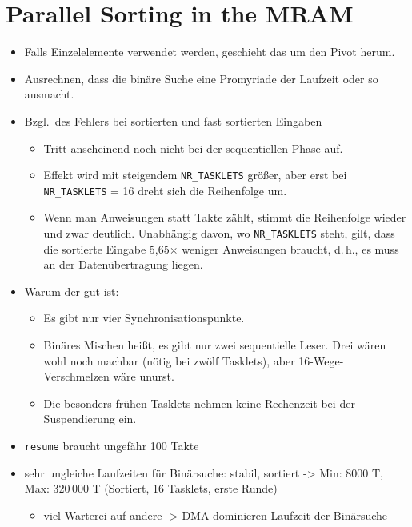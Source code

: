 \chapter{Parallel Sorting in the MRAM}
\label{sec:par}

\begin{itemize}
	\item
	Falls Einzelelemente verwendet werden, geschieht das um den Pivot herum.

	\item
	Ausrechnen, dass die binäre Suche eine Promyriade der Laufzeit oder so ausmacht.

	\item
	Bzgl.\ des Fehlers bei sortierten und fast sortierten Eingaben
	\begin{itemize}
		\item
		Tritt anscheinend noch nicht bei der sequentiellen Phase auf.

		\item
		Effekt wird mit steigendem \lstinline|NR_TASKLETS| größer, aber erst bei \lstinline|NR_TASKLETS| = 16 dreht sich die Reihenfolge um.

		\item
		Wenn man Anweisungen statt Takte zählt, stimmt die Reihenfolge wieder und zwar deutlich.
		Unabhängig davon, wo \lstinline|NR_TASKLETS| steht, gilt, dass die sortierte Eingabe 5,65× weniger Anweisungen braucht, d.\,h., es muss an der Datenübertragung liegen.
	\end{itemize}

	\item
	Warum der \MS{} gut ist:
	\begin{itemize}
		\item
		Es gibt nur vier Synchronisationspunkte.

		\item
		Binäres Mischen heißt, es gibt nur zwei sequentielle Leser. Drei wären wohl noch machbar (nötig bei zwölf Tasklets), aber 16-Wege-Verschmelzen wäre unurst.

		\item
		Die besonders frühen Tasklets nehmen keine Rechenzeit bei der Suspendierung ein.
	\end{itemize}

	\item
	\lstinline|resume| braucht ungefähr 100 Takte

	\item
	sehr ungleiche Laufzeiten für Binärsuche:
	stabil, sortiert -> Min: 8000 T, Max: 320\,000 T (Sortiert, 16 Tasklets, erste Runde)
	\begin{itemize}
		\item
		viel Warterei auf andere -> DMA dominieren Laufzeit der Binärsuche


\end{itemize}
\end{itemize}
